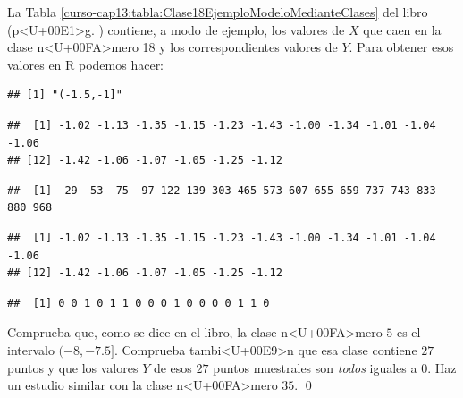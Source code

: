 \documentclass[10pt,a4paper]{article}
\newcounter {cont01}
\begin{document}
\begin{enumerate}
La Tabla \ref{curso-cap13:tabla:Clase18EjemploModeloMedianteClases} del libro (p<U+00E1>g. \pageref{curso-cap13:tabla:Clase18EjemploModeloMedianteClases}) contiene, a modo de ejemplo, los valores de $X$ que caen en la clase n<U+00FA>mero 18 y los correspondientes valores de $Y$. Para obtener esos valores en R podemos hacer:
\begin{knitrout}
\color{fgcolor}\begin{kframe}
\begin{alltt}
 \hlkwb{=} \hlstd{(clases)[}\hlstd{])}
\end{alltt}
\begin{verbatim}
## [1] "(-1.5,-1]"
\end{verbatim}
\begin{alltt}
\hlstd{X[clases} \hlopt{==} \hlstd{claseElegida]}
\end{alltt}
\begin{verbatim}
##  [1] -1.02 -1.13 -1.35 -1.15 -1.23 -1.43 -1.00 -1.34 -1.01 -1.04 -1.06
## [12] -1.42 -1.06 -1.07 -1.05 -1.25 -1.12
\end{verbatim}
\begin{alltt}
 \hlkwb{=}  \hlopt{==} 
\end{alltt}
\begin{verbatim}
##  [1]  29  53  75  97 122 139 303 465 573 607 655 659 737 743 833 880 968
\end{verbatim}
\begin{alltt}
\end{alltt}
\begin{verbatim}
##  [1] -1.02 -1.13 -1.35 -1.15 -1.23 -1.43 -1.00 -1.34 -1.01 -1.04 -1.06
## [12] -1.42 -1.06 -1.07 -1.05 -1.25 -1.12
\end{verbatim}
\begin{alltt}
\end{alltt}
\begin{verbatim}
##  [1] 0 0 1 0 1 1 0 0 0 1 0 0 0 0 1 1 0
\end{verbatim}
\end{kframe}
\end{knitrout}

\begin{ejercicio}
\label{tut13:ejercicio01}
Comprueba que, como se dice en el libro, la clase n<U+00FA>mero $5$ es el intervalo $(-8,-7.5]$. Comprueba tambi<U+00E9>n que esa clase contiene $27$ puntos y que los valores $Y$ de esos $27$ puntos muestrales son {\em todos} iguales a $0$. Haz un estudio similar con la clase n<U+00FA>mero $35$.
\qed
\end{ejercicio}



\end{enumerate}
\end{document}
